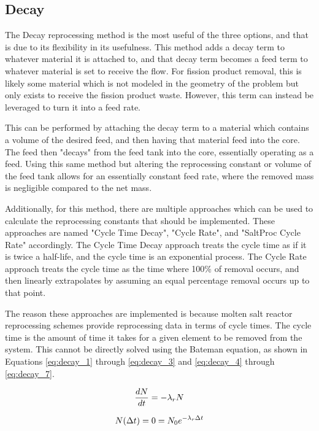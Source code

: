 \subsection{Decay}
The Decay reprocessing method is the most useful of the three options, and that is due to its flexibility in its usefulness. This method adds a decay term to whatever material it is attached to, and that decay term becomes a feed term to whatever material is set to receive the flow. For fission product removal, this is likely some material which is not modeled in the geometry of the problem but only exists to receive the fission product waste. However, this term can instead be leveraged to turn it into a feed rate.

This can be performed by attaching the decay term to a material which contains a volume of the desired feed, and then having that material feed into the core. The feed then "decays" from the feed tank into the core, essentially operating as a feed. Using this same method but altering the reprocessing constant or volume of the feed tank allows for an essentially constant feed rate, where the removed mass is negligible compared to the net mass.

Additionally, for this method, there are multiple approaches which can be used to calculate the reprocessing constants that should be implemented. These approaches are named "Cycle Time Decay", "Cycle Rate", and "SaltProc Cycle Rate" accordingly. The Cycle Time Decay approach treats the cycle time as if it is twice a half-life, and the cycle time is an exponential process. The Cycle Rate approach treats the cycle time as the time where 100\% of removal occurs, and then linearly extrapolates by assuming an equal percentage removal occurs up to that point.

The reason these approaches are implemented is because molten salt reactor reprocessing schemes provide reprocessing data in terms of cycle times. The cycle time is the amount of time it takes for a given element to be removed from the system. This cannot be directly solved using the Bateman equation, as shown in Equations \eqref{eq:decay_1} through \eqref{eq:decay_3} and \eqref{eq:decay_4} through \eqref{eq:decay_7}.

\begin{equation} \hfill
\frac{dN}{dt} = -\lambda_r N
\hfill\label{eq:decay_1} \end{equation}

\begin{equation} \hfill
N(\Delta t) = 0 = N_0 e^{-\lambda_r \Delta t}
\hfill\label{eq:decay_2} \end{equation}

